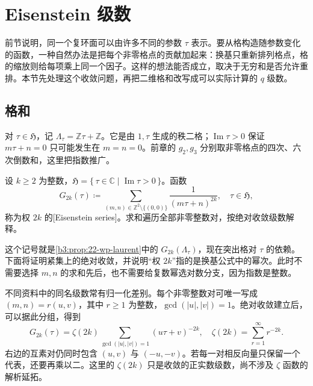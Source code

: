 \section{Eisenstein 级数}
\label{b3:sec:2302}

前节说明，同一个复环面可以由许多不同的参数 \(\tau\) 表示。要从格构造随参数变化的函数，一种自然办法是把每个非零格点的贡献加起来：换基只重新排列格点，格的缩放则给每项乘上同一个因子。这样的想法能否成立，取决于无穷和是否允许重排。本节先处理这个收敛问题，再把二维格和改写成可以实际计算的 \(q\) 级数。

\subsection{格和}
\label{b3:subsec:230201}

对 \(\tau\in\mathfrak H\)，记 \(\Lambda_\tau=\mathbb Z\tau+\mathbb Z\)。它是由 \(1,\tau\) 生成的秩二格；\(\operatorname{Im}\tau>0\) 保证 \(m\tau+n=0\) 只可能发生在 \(m=n=0\)。前章的 \(g_2,g_3\) 分别取非零格点的四次、六次倒数和，这里把指数推广。

\begin{definition}[Eisenstein 级数]\label{b3:def:23-eisenstein}
设 \(k\ge2\) 为整数，\(\mathfrak H=\{\,\tau\in\mathbb C\mid\operatorname{Im}\tau>0\,\}\)。函数
\begin{equation}\label{b3:eq:23-eisenstein-lattice}
 G_{2k}(\tau)\coloneqq
 \sum_{(m,n)\in\mathbb Z^2\setminus\{(0,0)\}}
 \frac1{(m\tau+n)^{2k}},\quad \tau\in\mathfrak H,
\end{equation}
称为权 \(2k\) 的[Eisenstein series]。求和遍历全部非零整数对，按绝对收敛级数解释。
\end{definition}
这个记号就是\cref{b3:prop:22-wp-laurent}中的 \(G_{2k}(\Lambda_\tau)\)，现在突出格对 \(\tau\) 的依赖。下面将证明紧集上的绝对收敛，并说明“权 \(2k\)”指的是换基公式中的幂次。此时不需要选择 \(m,n\) 的求和先后，也不需要给复数幂选对数分支，因为指数是整数。

\ProseParagraphBreak

不同资料中的同名级数常有归一化差别。每个非零整数对可唯一写成 \((m,n)=r(u,v)\)，其中 \(r\ge1\) 为整数，\(\gcd(|u|,|v|)=1\)。绝对收敛建立后，可以据此分组，得到
\[
 G_{2k}(\tau)=\zeta(2k)
 \sum_{\gcd(|u|,|v|)=1}(u\tau+v)^{-2k},
 \quad \zeta(2k)=\sum_{r=1}^{\infty}r^{-2k}.
\]
右边的互素对仍同时包含 \((u,v)\) 与 \((-u,-v)\)。若每一对相反向量只保留一个代表，还要再乘以二。这里的 \(\zeta(2k)\) 只是收敛的正实数级数，尚不涉及 \(\zeta\) 函数的解析延拓。

